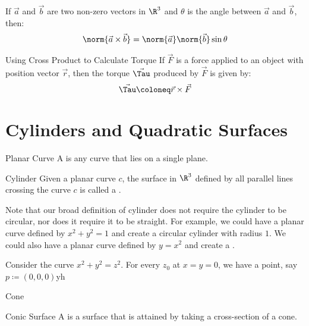 \documentclass[math]{amznotes}
\begin{document}
\begin{thmbox}{}{}
    If $\vec{a}$ and $\vec{b}$ are two non-zero vectors in $\R^3$ and $\theta$ is the angle between $\vec{a}$ and $\vec{b}$, then:
    \[ \norm{\vec{a} \times \vec{b}} = \norm{\vec{a}} \norm{\vec{b}} \sin{\theta} \]
\end{thmbox}

\begin{tecbox}{Using Cross Product to Calculate Torque}{}
    If $\vec{F}$ is a force applied to an object with position vector $\vec{r}$, then the torque $\vec{\Tau}$ produced by $\vec{F}$ is given by:
    \[ \vec{\Tau} \coloneq \vec{r} \times \vec{F} \]
\end{tecbox}

\section{Cylinders and Quadratic Surfaces}

\begin{dfnbox}{Planar Curve}{}
    A  is any curve that lies on a single plane.
\end{dfnbox}

\begin{dfnbox}{Cylinder}{}
    Given a planar curve $c$, the surface in $\R^3$ defined by all parallel lines crossing the curve $c$ is called a .
\end{dfnbox}

Note that our broad definition of cylinder does not require the cylinder to be circular, nor does it require it to be straight. For example, we could have a planar curve defined by $x^2 + y^2 = 1$ and create a circular cylinder with radius $1$. We could also have a planar curve defined by $y = x^2$ and create a .

\begin{exbox}{}{}
    Consider the curve $x^2+y^2=z^2$. For every $z_0$ at $x=y=0$, we have a point, say $p \coloneq (0,0,0)$yh
\end{exbox}

\begin{dfnbox}{Cone}{}

\end{dfnbox}

\begin{dfnbox}{Conic Surface}{}
    A  is a surface that is attained by taking a cross-section of a cone.
\end{dfnbox}
\end{document}
